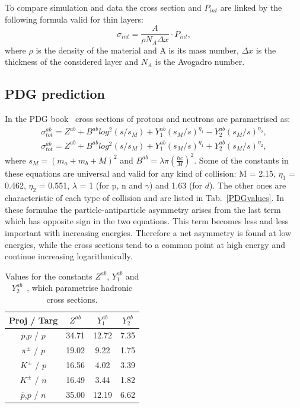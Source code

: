 To compare simulation and data the cross section and $P_{int}$ are linked by the following formula valid for thin layers:
%
\begin{equation}
\label{sigmaPint}
\sigma_{int} = \frac{A}{\rho N_A \Delta x} \cdot P_{int},
\end{equation}
%
where $\rho$ is the density of the material and A is its mass number, $\Delta x$ is the thickness of the considered layer and $N_A$ is the Avogadro number.

\subsection{PDG prediction}

In the PDG book~\cite{PDG2014} cross sections of protons and neutrons are parametrised as:
%
\begin{align} 
\sigma_{tot}^{ab} = Z^{ab} + B^{ab}log^2(s/s_M) + Y^{ab}_1(s_M/s)^{\eta_1} - Y^{ab}_2(s_M/s)^{\eta_2}, \\
\sigma^{\bar{a}b}_{tot} = Z^{ab} + B^{ab}log^2(s/s_M) + Y^{ab}_1(s_M/s)^{\eta_1} + Y^{ab}_2(s_M/s)^{\eta_2},
\end{align}
%
where $s_M = (m_a + m_b + M)^2$ and $B^{ab} = \lambda \pi ( \frac{\hbar c }{M}  )^2$. Some of the constants in these 
equations are universal and valid for any kind of collision: M = 2.15, $\eta_1$ = 0.462, $\eta_2$ = 0.551, $\lambda$ = 1 
(for p, n and $\gamma$) and 1.63 (for $d$). The other ones are characteristic of each type of collision and are listed 
in Tab.~\ref{PDGvalues}. In these formulae the particle-antiparticle asymmetry arises from the last term which has opposite
sign in the two equations. This term becomes less and less important with increasing energies. Therefore a net asymmetry 
is found at low energies, while the cross sections tend to a common point at high energy and continue increasing logarithmically.
%
\begin{center}
\begin{table}[b]
\centering
\begin{tabular}{ c | c | c | c }
Proj / Targ     &    $Z^{ab}$    &    $Y_1^{ab}$    &    $Y_2^{ab}$ \\
\hline
$\bar{p}$,$p$ / $p$     &    34.71   &     12.72     &    7.35 \\
$\pi^\pm$ / $p$           &     19.02  &      9.22    &   1.75  \\
$K^\pm$ / $p$             &     16.56  &      4.02      &    3.39 \\
$K^\pm$ / $n$              &     16.49 &    3.44        &    1.82 \\
$\bar{p}$,$p$ / $n$     &    35.00   &   12.19       & 6.62 \\
\end{tabular}
\caption{Values for the constants $Z^{ab}$, $Y^{ab}_1$ and $Y^{ab}_2$~\cite{PDG2014}, 
which parametrise hadronic cross sections. }
\end{table}
\label{PDGvalues}
\end{center}


